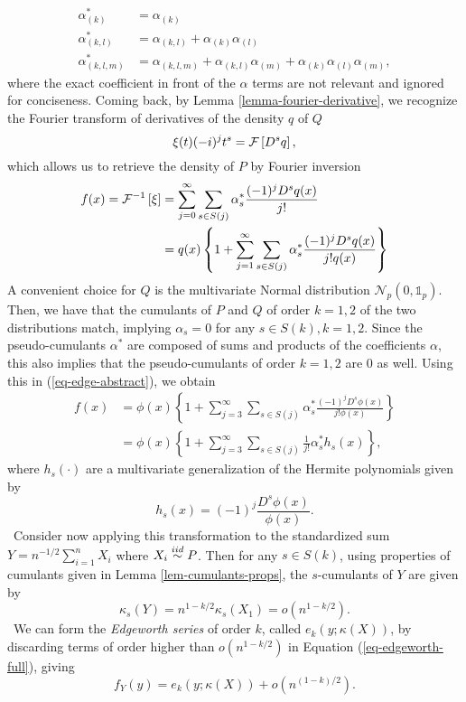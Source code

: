 \begin{align*}
    \alpha^*_{(k)} &= \alpha_{(k)} \\
    \alpha^*_{(k, l)} &= \alpha_{(k, l)} + \alpha_{(k)}\alpha_{(l)}\\
    \alpha^*_{(k, l, m)} &= \alpha_{(k, l, m)} + \alpha_{(k, l)}\alpha_{(m)} + \alpha_{(k)}\alpha_{(l)}\alpha_{(m)},
\end{align*}
where the exact coefficient in front of the $\alpha$ terms are not relevant and ignored for conciseness. Coming back, by Lemma \ref{lemma-fourier-derivative}, we recognize the Fourier transform of derivatives of the density $q$ of $Q$
\begin{equation*}
    \xi(t) (-i)^{j} t^s  = \mathcal{F} \left[ D^s q \right],
\end{equation*}
which allows us to retrieve the density of $P$ by Fourier inversion
\begin{align}\label{eq-edge-abstract}
    f(x) = \mathcal{F}^{-1}\left[\xi\right] &= 
    \sum_{j=0}^\infty 
    \sum_{s \in S(j)}
    \alpha^*_s \frac{(-1)^j D^s q(x)}{j!}\nonumber\\
    &= 
    q(x) \left\{ 1 + \sum_{j=1}^\infty 
    \sum_{s \in S(j)}
    \alpha^*_s \frac{(-1)^j D^s q(x)}{j! q(x)}\right\}
\end{align}
A convenient choice for $Q$ is the multivariate Normal distribution $\mathcal{N}_p(0, \mathbb{1}_p)$. Then, we have that the cumulants of $P$ and $Q$ of order $k=1,2$ of the two distributions match, implying $\alpha_s = 0$ for any $s \in S(k), k=1,2$. Since the pseudo-cumulants $\alpha^*$ are composed of sums and products of the coefficients $\alpha$, this also implies that the pseudo-cumulants of order $k=1,2$ are 0 as well. Using this in (\ref{eq-edge-abstract}), we obtain
\begin{align}
    f(x) 
    &= \phi(x) \left\{ 1 + \sum_{j=3}^\infty 
    \sum_{s \in S(j)}
    \alpha^*_s \frac{(-1)^j D^s \phi(x)}{j! \phi(x)}\right\} \nonumber \\
    &= \phi(x) \left\{
        1 + \sum_{j=3}^\infty  \sum_{s \in S(j)} \frac{1}{j!}\alpha^*_s h_s(x)
    \right\}, \label{eq-edgeworth-full}
\end{align} 
where $h_s(\cdot)$ are a multivariate generalization of the Hermite polynomials given by
\begin{equation*}
    h_s(x) = (-1)^j \frac{D^s \phi(x)}{\phi(x)}.
\end{equation*}
\
Consider now applying this transformation to the standardized sum $Y = n^{-1/2}\sum_{i=1}^n X_i$ where $X_i \stackrel{iid}{\sim} P$. Then for any $s \in S(k)$, using properties of cumulants given in Lemma \ref{lem-cumulants-props}, the $s$-cumulants of $Y$ are given by 
\begin{equation*}
    \kappa_s(Y) = n^{1-k/2} \kappa_s(X_1) = o(n^{1-k/2}).
\end{equation*}
\
We can form the \textit{Edgeworth series} of order $k$, called $e_k(y; \kappa(X))$, by discarding terms of order higher than $o(n^{1-k/2})$ in Equation (\ref{eq-edgeworth-full}), giving
\begin{equation} \label{eq-edgeworth}
    f_Y(y) = e_k(y; \kappa(X)) + o(n^{(1-k)/2}).
\end{equation}

